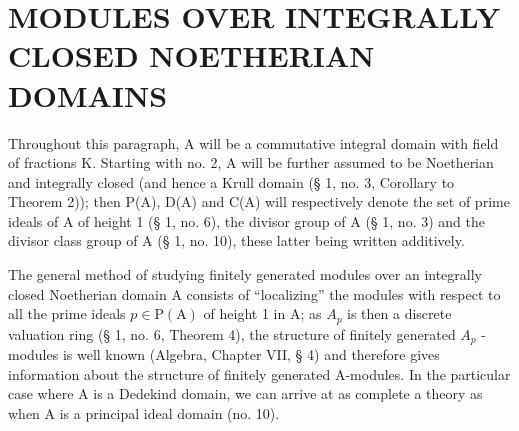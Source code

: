 \section{MODULES OVER INTEGRALLY CLOSED NOETHERIAN DOMAINS}

Throughout this paragraph, A will be a commutative integral domain with field of fractions K. Starting with no. 2, A will be further assumed to be Noetherian and integrally closed (and hence a Krull domain (§ 1, no. 3, Corollary to Theorem 2)); then P(A), D(A) and C(A) will respectively denote the set of prime ideals of A of height 1 (§ 1, no. 6), the divisor group of A (§ 1, no. 3) and the divisor class group of A (§ 1, no. 10), these latter being written additively.

The general method of studying finitely generated modules over an integrally closed Noetherian domain A consists of ``localizing'' the modules with respect to all the prime ideals \(p \in \mathrm{P}(\mathrm{A})\) of height 1 in A; as \(A_{p}\) is then a discrete valuation ring (§ 1, no. 6, Theorem 4), the structure of finitely generated \(A_{p}\) -modules is well known (Algebra, Chapter VII, § 4) and therefore gives information about the structure of finitely generated A-modules. In the particular case where A is a Dedekind domain, we can arrive at as complete a theory as when A is a principal ideal domain (no. 10).

